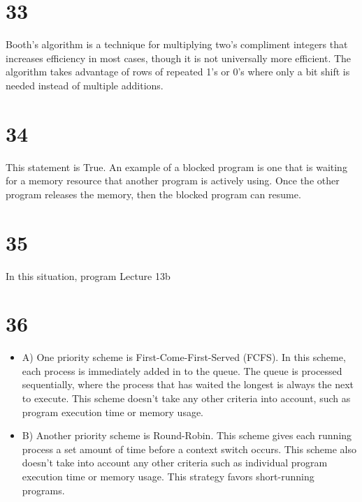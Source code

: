 \documentclass[a4paper,11pt]{article}
\begin{document}

\section*{33}
Booth's algorithm is a technique for multiplying two's compliment integers that increases efficiency in most cases, though it is not universally more efficient.  The algorithm takes advantage of rows of repeated 1's or 0's where only a bit shift is needed instead of multiple additions.  


\section*{34}
This statement is True.  An example of a blocked program is one that is waiting for a memory resource that another program is actively using.  Once the other program releases the memory, then the blocked program can resume.


\section*{35}
In this situation, program  Lecture 13b


\section*{36}
\begin{itemize}
  \item A) One priority scheme is First-Come-First-Served (FCFS).  In this scheme, each process is immediately added in to the queue.  The queue is processed sequentially, where the process that has waited the longest is always the next to execute.  This scheme doesn't take any other criteria into account, such as program execution time or memory usage.
  \item B) Another priority scheme is Round-Robin.  This scheme gives each running process a set amount of time before a context switch occurs.  This scheme also doesn't take into account any other criteria such as individual program execution time or memory usage.  This strategy favors short-running programs.
\end{itemize}
\end{document}
